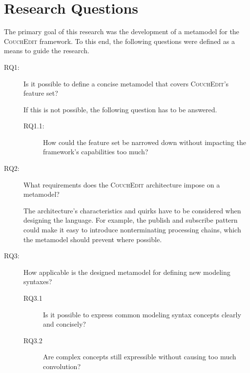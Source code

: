 \section{Research Questions}
The primary goal of this research was the development of a metamodel for the \textsc{CouchEdit} framework. To this end, the following questions were defined as a means to guide the research.

\begin{description} 
  \item[RQ1:] Is it possible to define a concise metamodel that covers \textsc{CouchEdit}'s feature set?

        If this is not possible, the following question has to be answered.
        \begin{description}
          \item[RQ1.1:] How could the feature set be narrowed down without impacting the framework's capabilities too much?
        \end{description}

  \item[RQ2:] What requirements does the \textsc{CouchEdit} architecture impose on a metamodel?

        The architecture's characteristics and quirks have to be considered when designing the language. For example, the publish and subscribe pattern could make it easy to introduce nonterminating processing chains, which the metamodel should prevent where possible.

  \item[RQ3:] How applicable is the designed metamodel for defining new modeling syntaxes?

        \begin{description}
          \item[RQ3.1] Is it possible to express common modeling syntax concepts clearly and concisely?
          \item[RQ3.2] Are complex concepts still expressible without causing too much convolution?
        \end{description}
\end{description}



